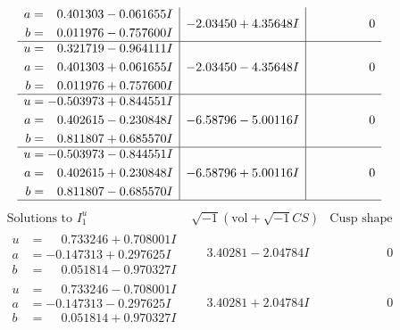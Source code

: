 \documentclass[1p]{elsarticle_modified}
\theoremstyle{definition}
\newcommand{\I}{\sqrt{-1}}
\begin{document}
$$\begin{array}{c|c|c}
\begin{aligned}
a &= \phantom{-}0.401303 - 0.061655 I \\
b &= \phantom{-}0.011976 - 0.757600 I\end{aligned}
 & -2.03450 + 4.35648 I & \phantom{-0.000000 } 0 \\ \hline\begin{aligned}
u &= \phantom{-}0.321719 - 0.964111 I \\
a &= \phantom{-}0.401303 + 0.061655 I \\
b &= \phantom{-}0.011976 + 0.757600 I\end{aligned}
 & -2.03450 - 4.35648 I & \phantom{-0.000000 } 0 \\ \hline\begin{aligned}
u &= -0.503973 + 0.844551 I \\
a &= \phantom{-}0.402615 - 0.230848 I \\
b &= \phantom{-}0.811807 + 0.685570 I\end{aligned}
 & -6.58796 - 5.00116 I & \phantom{-0.000000 } 0 \\ \hline\begin{aligned}
u &= -0.503973 - 0.844551 I \\
a &= \phantom{-}0.402615 + 0.230848 I \\
b &= \phantom{-}0.811807 - 0.685570 I\end{aligned}
 & -6.58796 + 5.00116 I & \phantom{-0.000000 } 0\\
 \hline 
 \end{array}$$\newpage$$\begin{array}{c|c|c}  
\text{Solutions to }I^u_{1}& \I (\text{vol} + \sqrt{-1}CS) & \text{Cusp shape}\\
 \hline 
\begin{aligned}
u &= \phantom{-}0.733246 + 0.708001 I \\
a &= -0.147313 + 0.297625 I \\
b &= \phantom{-}0.051814 - 0.970327 I\end{aligned}
 & \phantom{-}3.40281 - 2.04784 I & \phantom{-0.000000 } 0 \\ \hline\begin{aligned}
u &= \phantom{-}0.733246 - 0.708001 I \\
a &= -0.147313 - 0.297625 I \\
b &= \phantom{-}0.051814 + 0.970327 I\end{aligned}
 & \phantom{-}3.40281 + 2.04784 I & \phantom{-0.000000 } 0 \\ \hline\begin{aligned}

\end{aligned}
\end{array}$$
\end{document}
